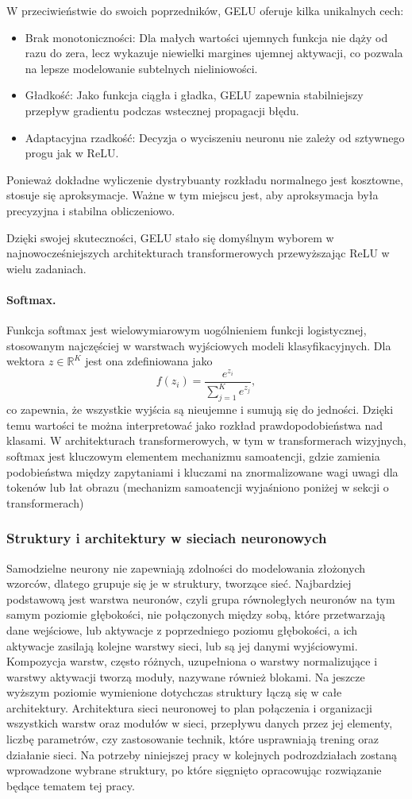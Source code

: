 W przeciwieństwie do swoich poprzedników, GELU oferuje kilka unikalnych cech:
\begin{itemize}
	\item{Brak monotoniczności:} Dla małych wartości ujemnych funkcja nie dąży od razu do zera, lecz wykazuje niewielki margines ujemnej aktywacji, co pozwala na lepsze modelowanie subtelnych nieliniowości.
	\item{Gładkość:} Jako funkcja ciągła i gładka, GELU zapewnia stabilniejszy przepływ gradientu podczas wstecznej propagacji błędu.
	\item{Adaptacyjna rzadkość:} Decyzja o wyciszeniu neuronu nie zależy od sztywnego progu jak w ReLU.
\end{itemize}
Ponieważ dokładne wyliczenie dystrybuanty rozkładu normalnego jest kosztowne, stosuje się aproksymacje. Ważne w tym miejscu jest, aby aproksymacja była precyzyjna i stabilna obliczeniowo.

Dzięki swojej skuteczności, GELU stało się domyślnym wyborem w najnowocześniejszych architekturach transformerowych przewyższając ReLU w wielu zadaniach.
\paragraph{Softmax.}
Funkcja softmax jest wielowymiarowym uogólnieniem funkcji logistycznej, stosowanym najczęściej w warstwach wyjściowych modeli klasyfikacyjnych.
Dla wektora \(z \in \mathbb{R}^K\) jest ona zdefiniowana jako
\[f(z_i)=\frac{e^{z_i}}{\sum_{j=1}^{K} e^{z_j}},\]
co zapewnia, że wszystkie wyjścia są nieujemne i sumują się do jedności.
Dzięki temu wartości te można interpretować jako rozkład prawdopodobieństwa nad klasami. W architekturach transformerowych, w tym w transformerach wizyjnych, softmax jest kluczowym elementem mechanizmu samoatencji, gdzie zamienia podobieństwa między zapytaniami i kluczami na znormalizowane wagi uwagi dla tokenów lub łat obrazu (mechanizm samoatencji wyjaśniono poniżej w sekcji o transformerach)

\subsubsection{Struktury i architektury w sieciach neuronowych}
Samodzielne neurony nie zapewniają zdolności do modelowania złożonych wzorców, dlatego grupuje się je w struktury, tworzące sieć. Najbardziej podstawową jest warstwa neuronów, czyli grupa równoległych neuronów na tym samym poziomie głębokości, nie połączonych między sobą, które przetwarzają dane wejściowe, lub aktywacje z poprzedniego poziomu głębokości, a ich aktywacje zasilają kolejne warstwy sieci, lub są jej danymi wyjściowymi. Kompozycja warstw, często różnych, uzupełniona o warstwy normalizujące i warstwy aktywacji tworzą moduły, nazywane również blokami. Na jeszcze wyższym poziomie wymienione dotychczas struktury łączą się w całe architektury. Architektura sieci neuronowej to plan połączenia i organizacji wszystkich warstw oraz modułów w sieci, przepływu danych przez jej elementy, liczbę parametrów, czy zastosowanie technik, które usprawniają trening oraz działanie sieci. Na potrzeby niniejszej pracy w kolejnych podrozdziałach zostaną wprowadzone wybrane struktury, po które sięgnięto opracowując rozwiązanie będące tematem tej pracy.


